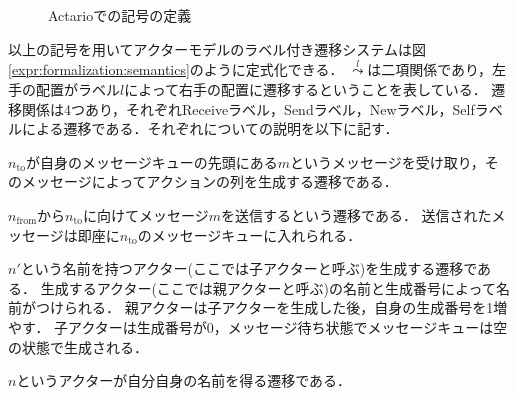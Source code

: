 \begin{figure}
  
  \caption{Actarioでの記号の定義}\label{code:formalization:config}
\end{figure}

以上の記号を用いてアクターモデルのラベル付き遷移システムは図\ref{expr:formalization:semantics}のように定式化できる．
$\overset{l}{\leadsto}$は二項関係であり，左手の配置がラベル$l$によって右手の配置に遷移するということを表している．
遷移関係は4つあり，それぞれ\textsf{Receive}ラベル，\textsf{Send}ラベル，\textsf{New}ラベル，\textsf{Self}ラベルによる遷移である．それぞれについての説明を以下に記す．

\begin{description}[style=nextline,leftmargin=12pt,parsep=0pt]
\item[$\textsf{Receive}(n_{\textrm{to}}, m)$]
  $n_{\textrm{to}}$が自身のメッセージキューの先頭にある$m$というメッセージを受け取り，そのメッセージによってアクションの列を生成する遷移である．
\item[$\textsf{Send}(n_{\textrm{from}}, n_{\textrm{to}}, m)$]
  $n_{\textrm{from}}$から$n_{\textrm{to}}$に向けてメッセージ$m$を送信するという遷移である．
  送信されたメッセージは即座に$n_{\textrm{to}}$のメッセージキューに入れられる．
\item[$\textsf{New}(n')$]
  $n'$という名前を持つアクター(ここでは子アクターと呼ぶ)を生成する遷移である．
  生成するアクター(ここでは親アクターと呼ぶ)の名前と生成番号によって名前がつけられる．
  親アクターは子アクターを生成した後，自身の生成番号を1増やす．
  子アクターは生成番号が0，メッセージ待ち状態でメッセージキューは空の状態で生成される．
\item[$\textsf{Self}(n)$]
  $n$というアクターが自分自身の名前を得る遷移である．
\end{description}


